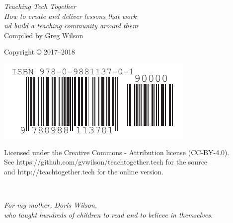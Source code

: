 \documentclass[10pt,statementpaper]{memoir}
\begin{document}
\pagestyle{empty}

{\begingroup
  \raggedleft
  \vspace*{\baselineskip}

  {\Huge\itshape Teaching Tech Together}\\[\baselineskip]

  {\large\itshape
    How to create and deliver lessons that work\\
    nd build a teaching community around them
  }\\[0.2\textheight]

  {\large Compiled by Greg Wilson}\par

  \vfill

  {\large Copyright {\copyright} 2017--2018}

  \vspace*{\baselineskip}

  \includegraphics{../../etc/isbn-barcode.pdf}

  \vspace*{\baselineskip}

  {\small
    Licensed under the Creative Commons - Attribution license (CC-BY-4.0).
    \\
    See https://github.com/gvwilson/teachtogether.tech for the source\\
    and http://teachtogether.tech for the online version.
  }

\endgroup}

\newpage

\pagestyle{empty}

~

\newpage

\pagestyle{empty}

\vspace*{1.5in}

\begin{center}
{\em
For my mother, Doris Wilson,\\
who taught hundreds of children to read and to believe in themselves.
}
\end{center}
\end{document}
